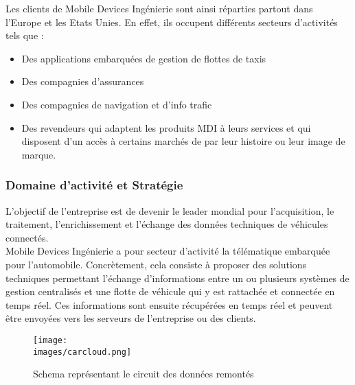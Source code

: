             
            Les clients de Mobile Devices Ingénierie sont ainsi réparties partout dans l'Europe et les Etats Unies. 
            En effet, ils occupent différents secteurs d’activités tels que :\\
            \begin{itemize}
                \renewcommand{\labelitemi}{$\bullet$}
                \item Des applications embarquées de gestion de flottes de taxis 
                \item Des compagnies d’assurances 
                \item Des compagnies de navigation et d'info trafic 
                \item Des revendeurs qui adaptent les produits MDI à leurs services et qui disposent d’un accès à certains marchés de par leur histoire ou leur image de marque.
            \end{itemize}


        \subsubsection{Domaine d'activité et Stratégie }
            L’objectif de l'entreprise est de devenir le leader mondial pour l'acquisition, le
            traitement, l'enrichissement et l’échange des données techniques de véhicules
            connectés.\\[0.3cm]

            Mobile Devices Ingénierie a pour secteur d’activité la télématique embarquée pour l'automobile. 
            Concrètement, cela consiste à proposer des solutions techniques permettant l'échange d'informations 
            entre un ou plusieurs systèmes de gestion centralisés et une flotte de véhicule qui y est rattachée 
            et connectée en temps réel.
            Ces informations sont ensuite récupérées en temps réel et peuvent être envoyées 
            vers les serveurs de l’entreprise ou des clients. \\[0.3cm]

            \begin{figure}[ht]
                \centering
                \texttt{[image: \\images/carcloud.png]}
                \caption{Schema représentant le circuit des données remontés  }
            \end{figure}
            
